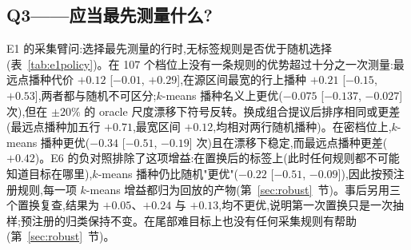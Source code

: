 \documentclass[11pt,a4paper]{ctexart}
\begin{document}
\begin{table}[htbp]
\centering\footnotesize
\caption{E5:五折表轮换下的规划预算。代价 = 超出档位所需预算的测量行数,或在规划不足时为满预算 20(对 81 个在 20 行内达到 $\varepsilon$ 的档位取平均)。"迁移"规则在四张表上学得、施加于第五张表;"表内"规则在留出表自身上学得。遗憾 = 迁移 $-$ 表内;区间为表级块 bootstrap。}
\label{tab:e5transfer}
\setlength{\tabcolsep}{3pt}
\end{table}
\subsection{Q3——应当最先测量什么?}
\label{sec:q3}
E1 的采集臂问:选择最先测量的行时,无标签规则是否优于随机选择(表~\ref{tab:e1policy})。在 107 个档位上没有一条规则的优势超过十分之一次测量:最远点播种代价 $+0.12$ [$-0.01$, $+0.29$],在源区间最宽的行上播种 $+0.21$ [$-0.15$, $+0.53$],两者都与随机不可区分;$k$-means 播种名义上更优($-0.075$ [$-0.137$, $-0.027$] 次),但在 $\pm 20\%$ 的 oracle 尺度漂移下符号反转。换成组合提议后排序相同或更差(最远点播种加五行 $+0.71$,最宽区间 $+0.12$,均相对两行随机播种)。在密档位上,$k$-means 播种更优($-0.34$ [$-0.51$, $-0.19$] 次)且在漂移下稳定,而最远点播种更差($+0.42$)。E6 的负对照排除了这项增益:在置换后的标签上(此时任何规则都不可能知道目标在哪里),$k$-means 播种仍比随机"更优"($-0.22$ [$-0.51$, $-0.09$]),因此按预注册规则,每一项 $k$-means 增益都归为回放的产物(第~\ref{sec:robust}~节)。事后另用三个置换复查,结果为 $+0.05$、$+0.24$ 与 $+0.13$,均不更优,说明第一次置换只是一次抽样;预注册的归类保持不变。在尾部难目标上也没有任何采集规则有帮助(第~\ref{sec:robust}~节)。
\end{document}

